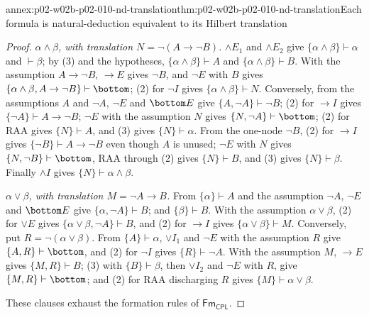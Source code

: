 \begin{annexitem}{annex:p02-w02b-p02-010-nd-translation}{thm:p02-w02b-p02-010-nd-translation}{Each formula is natural-deduction equivalent to its Hilbert translation}
\begin{proof}
\emph{\(\alpha\land\beta\), with translation \(N=\neg(A\to\neg B)\).}
\(\land E_1\) and \(\land E_2\) give \(\{\alpha\land\beta\}\vdash\alpha\) and
\(\vdash\beta\); by (3) and the hypotheses, \(\{\alpha\land\beta\}\vdash A\)
and \(\{\alpha\land\beta\}\vdash B\).  With the assumption \(A\to\neg B\),
\(\to E\) gives \(\neg B\), and \(\neg E\) with \(B\) gives
\(\{\alpha\land\beta,A\to\neg B\}\vdash\bottom\); (2) for \(\neg I\) gives
\(\{\alpha\land\beta\}\vdash N\).  Conversely, from the assumptions \(A\)
and \(\neg A\), \(\neg E\) and \(\bottom E\) give
\(\{A,\neg A\}\vdash\neg B\); (2) for \(\to I\) gives
\(\{\neg A\}\vdash A\to\neg B\); \(\neg E\) with the assumption \(N\) gives
\(\{N,\neg A\}\vdash\bottom\); (2) for RAA gives \(\{N\}\vdash A\), and (3)
gives \(\{N\}\vdash\alpha\).  From the one-node \(\neg B\), (2) for
\(\to I\) gives \(\{\neg B\}\vdash A\to\neg B\) even though \(A\) is unused;
\(\neg E\) with \(N\) gives \(\{N,\neg B\}\vdash\bottom\), RAA through (2)
gives \(\{N\}\vdash B\), and (3) gives \(\{N\}\vdash\beta\).  Finally
\(\land I\) gives \(\{N\}\vdash\alpha\land\beta\).

\emph{\(\alpha\lor\beta\), with translation \(M=\neg A\to B\).}  From
\(\{\alpha\}\vdash A\) and the assumption \(\neg A\), \(\neg E\) and
\(\bottom E\) give \(\{\alpha,\neg A\}\vdash B\); and \(\{\beta\}\vdash B\).
With the assumption \(\alpha\lor\beta\), (2) for \(\lor E\) gives
\(\{\alpha\lor\beta,\neg A\}\vdash B\), and (2) for \(\to I\) gives
\(\{\alpha\lor\beta\}\vdash M\).  Conversely, put
\(R=\neg(\alpha\lor\beta)\).  From \(\{A\}\vdash\alpha\), \(\lor I_1\) and
\(\neg E\) with the assumption \(R\) give \(\{A,R\}\vdash\bottom\), and (2)
for \(\neg I\) gives \(\{R\}\vdash\neg A\).  With the assumption \(M\),
\(\to E\) gives \(\{M,R\}\vdash B\); (3) with \(\{B\}\vdash\beta\), then
\(\lor I_2\) and \(\neg E\) with \(R\), give \(\{M,R\}\vdash\bottom\); and (2)
for RAA discharging \(R\) gives \(\{M\}\vdash\alpha\lor\beta\).

These clauses exhaust the formation rules of \(\mathsf{Fm}_{\mathsf{CPL}}\).
\end{proof}
\end{annexitem}

